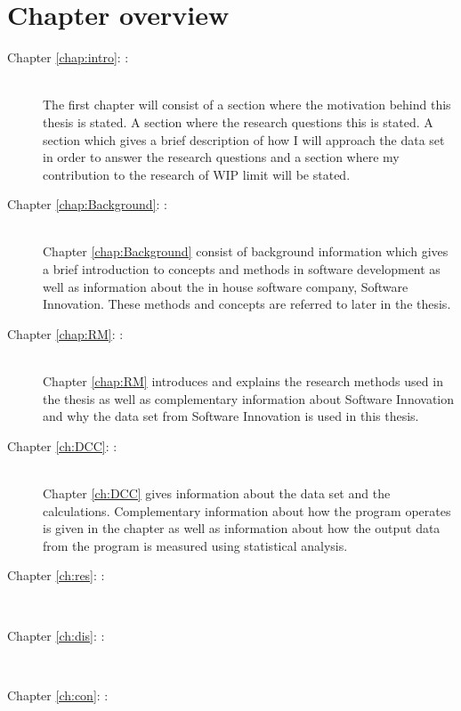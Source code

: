 \documentclass[UKenglish]{ifimaster}  %
\begin{document}
\section{Chapter overview}
\begin{description}
\item[Chapter \ref{chap:intro}: :] \hfill \\
The first chapter will consist of a section where the motivation behind this thesis is stated. A section where the research questions this is stated. A section which gives a brief description of how I will approach the data set in order to answer the research questions and a section where my contribution to the research of WIP limit will be stated.
\item[Chapter \ref{chap:Background}: :] \hfill \\  
Chapter \ref{chap:Background} consist of background information which gives a brief introduction to concepts and methods in software development as well as information about the in house software company, Software Innovation. These methods and concepts are referred to later in the thesis.  
\item[Chapter \ref{chap:RM}: :] \hfill \\  
Chapter \ref{chap:RM} introduces and explains the research methods used in the thesis as well as complementary information about Software Innovation and why the data set from Software Innovation is used in this thesis.  
\item[Chapter \ref{ch:DCC}: :] \hfill \\
Chapter \ref{ch:DCC} gives information about the data set and the calculations. Complementary information about how the program operates is given in the chapter as well as information about how the output data from the program is measured using statistical analysis. 

\item[Chapter \ref{ch:res}: :] \hfill \\
\item[Chapter \ref{ch:dis}: :] \hfill \\
\item[Chapter \ref{ch:con}: :] \hfill \\
\end{description}




\end{document}
